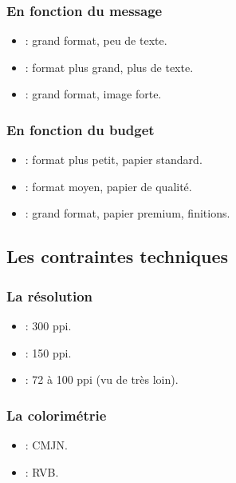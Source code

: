 \subsubsection{En fonction du message}

\begin{itemize}
    \item {} : grand format, peu de texte.
    \item {} : format plus grand, plus de texte.
    \item {} : grand format, image forte.
\end{itemize}

\subsubsection{En fonction du budget}

\begin{itemize}
    \item {} : format plus petit, papier standard.
    \item {} : format moyen, papier de qualité.
    \item {} : grand format, papier premium, finitions.
\end{itemize}

\subsection{Les contraintes techniques}

\subsubsection{La résolution}

\begin{itemize}
    \item {} : 300 ppi.
    \item {} : 150 ppi.
    \item {} : 72 à 100 ppi (vu de très loin).
\end{itemize}

\subsubsection{La colorimétrie}

\begin{itemize}
    \item {} : CMJN.
    \item {} : RVB.
\end{itemize}


